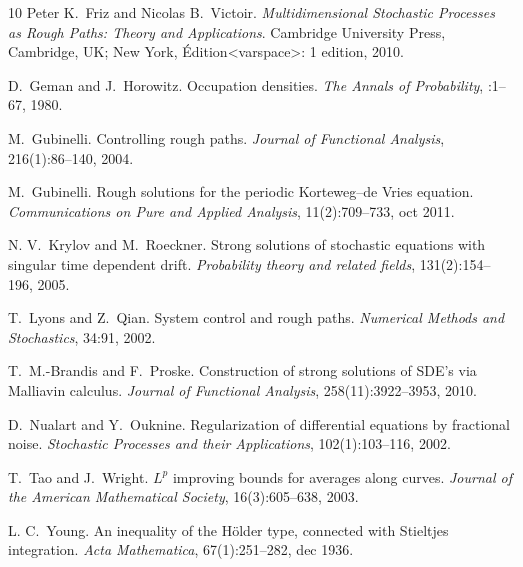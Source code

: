 \documentclass[a4paper,11pt]{article}
\newcommand{\tmtextit}[1]{{\itshape{#1}}}
\begin{document}
\begin{thebibliography}{10}
  Peter K.~Friz{{ and }}Nicolas
  B.~Victoir.{\newblock} \tmtextit{Multidimensional Stochastic Processes as
  Rough Paths: Theory and Applications}.{\newblock} Cambridge University
  Press, Cambridge, UK; New York, Édition<varspace>: 1{{ edition}},
  2010.{\newblock}
  
  D.~Geman{{ and
  }}J.~Horowitz.{\newblock} Occupation densities.{\newblock} \tmtextit{The
  Annals of Probability}, :1--67, 1980.{\newblock}
  
  M.~Gubinelli.{\newblock} Controlling
  rough paths.{\newblock} \tmtextit{Journal of Functional Analysis},
  216(1):86--140, 2004.{\newblock}
  
  M.~Gubinelli.{\newblock} Rough solutions for the
  periodic {K}orteweg--de {V}ries equation.{\newblock}
  \tmtextit{Communications on Pure and Applied Analysis}, 11(2):709--733, oct
  2011.{\newblock}
  
  N. V.~Krylov{{ and
  }}M.~Roeckner.{\newblock} Strong solutions of stochastic equations with
  singular time dependent drift.{\newblock} \tmtextit{Probability theory and
  related fields}, 131(2):154--196, 2005.{\newblock}
  
  T.~Lyons{{ and }}Z.~Qian.{\newblock}
  System control and rough paths.{\newblock} \tmtextit{Numerical Methods and
  Stochastics}, 34:91, 2002.{\newblock}
  
  T.~M.-Brandis{{ and
  }}F.~Proske.{\newblock} Construction of strong solutions of SDE's via
  Malliavin calculus.{\newblock} \tmtextit{Journal of Functional Analysis},
  258(11):3922--3953, 2010.{\newblock}
  
  D.~Nualart{{ and }}Y.~Ouknine.{\newblock}
  Regularization of differential equations by fractional noise.{\newblock}
  \tmtextit{Stochastic Processes and their Applications}, 102(1):103--116,
  2002.{\newblock}
  
  T.~Tao{{ and }}J.~Wright.{\newblock}
  $L^{p}$ improving bounds for averages along curves.{\newblock}
  \tmtextit{Journal of the American Mathematical Society}, 16(3):605--638,
  2003.{\newblock}
  
  L. C.~Young.{\newblock} An inequality of the H\"older
  type, connected with Stieltjes integration.{\newblock} \tmtextit{Acta
  Mathematica}, 67(1):251--282, dec 1936.{\newblock}
\end{thebibliography}
\end{document}
